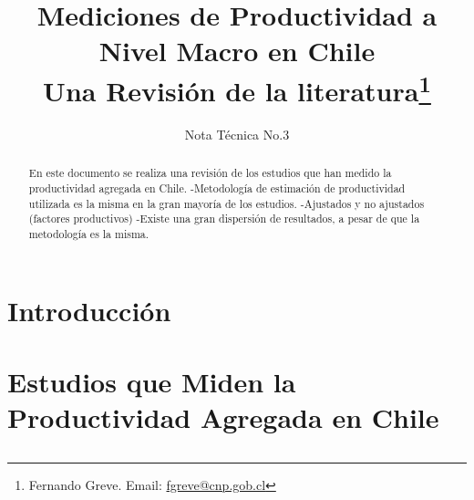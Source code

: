\documentclass[upright, contnum, 11pt]{article}
\title{\textbf{Mediciones de Productividad a Nivel Macro en Chile}\\ Una Revisión de la literatura\footnote{Fernando Greve. Email: \href{mailto:fgreve@cnp.gob.cl}{fgreve@cnp.gob.cl}}}
\author{Nota Técnica No.3}
\begin{document}
\maketitle

\begin{abstract} En este documento se realiza una revisión de los estudios que han medido la productividad agregada en Chile. 
-Metodología de estimación de productividad utilizada es la misma en la gran mayoría de los estudios.
-Ajustados y no ajustados (factores productivos)
-Existe una gran dispersión de resultados, a pesar de que la metodología es la misma.\end{abstract}

\section{Introducción}


\section{Estudios que Miden la Productividad Agregada en Chile}
\subsection{\cite{Bergoeing}}




\clearpage 
\subsection{\cite{DeGregorio}}




\clearpage
\subsection{\cite{Vergara}}




\clearpage
\subsection{\cite{Roldos}}




\clearpage
\subsection{\cite*{Fuentes-Larrain-SchmidtHebbel}}

\end{document}

